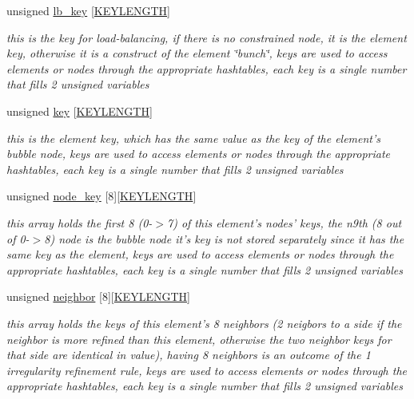 \begin{CompactItemize}
unsigned \hyperlink{classElement_r5}{lb\_\-key} \mbox{[}\hyperlink{constant_8h_a10}{KEYLENGTH}\mbox{]}
\begin{CompactList}\small\item\em this is the key for load-balancing, if there is no constrained node, it is the element key, otherwise it is a construct of the element \char`\"{}bunch\char`\"{}, keys are used to access elements or nodes through the appropriate hashtables, each key is a single number that fills 2 unsigned variables \item\end{CompactList}\item 
unsigned \hyperlink{classElement_r6}{key} \mbox{[}\hyperlink{constant_8h_a10}{KEYLENGTH}\mbox{]}
\begin{CompactList}\small\item\em this is the element key, which has the same value as the key of the element's bubble node, keys are used to access elements or nodes through the appropriate hashtables, each key is a single number that fills 2 unsigned variables \item\end{CompactList}\item 
unsigned \hyperlink{classElement_r7}{node\_\-key} \mbox{[}8\mbox{]}\mbox{[}\hyperlink{constant_8h_a10}{KEYLENGTH}\mbox{]}
\begin{CompactList}\small\item\em this array holds the first 8 (0-$>$7) of this element's nodes' keys, the n9th (8 out of 0-$>$8) node is the bubble node it's key is not stored separately since it has the same key as the element, keys are used to access elements or nodes through the appropriate hashtables, each key is a single number that fills 2 unsigned variables \item\end{CompactList}\item 
unsigned \hyperlink{classElement_r8}{neighbor} \mbox{[}8\mbox{]}\mbox{[}\hyperlink{constant_8h_a10}{KEYLENGTH}\mbox{]}
\begin{CompactList}\small\item\em this array holds the keys of this element's 8 neighbors (2 neigbors to a side if the neighbor is more refined than this element, otherwise the two neighbor keys for that side are identical in value), having 8 neighbors is an outcome of the 1 irregularity refinement rule, keys are used to access elements or nodes through the appropriate hashtables, each key is a single number that fills 2 unsigned variables \item\end{CompactList}\item 

\end{CompactItemize}
